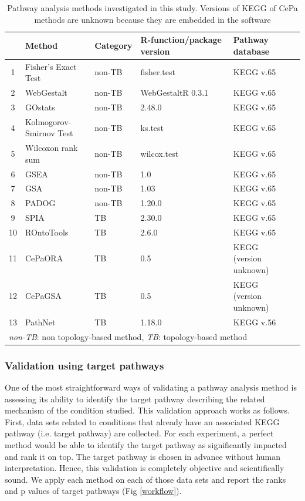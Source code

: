 \documentclass[Minh_PhD_thesis.tex]{subfiles}
\begin{document}
\begin{table}

\centering
\caption{Pathway analysis methods investigated in this study. Versions of KEGG of CePa methods are unknown because they are embedded in the software\label{table:PAmethods}} 
\small
\begin{tabular}{@{}clllll@{}}\hline
 & Method & Category  & R-function/package version & Pathway database \\\hline
1 & Fisher's Exact Test &	non-TB 	& fisher.test & KEGG v.65\\ 
2 & WebGestalt &	non-TB 	& WebGestaltR 0.3.1 & KEGG v.65\\ 
3 & GOstats &	non-TB 	&2.48.0 & KEGG v.65\\ 
4 & Kolmogorov-Smirnov Test& non-TB & ks.test & KEGG v.65\\
5 & Wilcoxon rank sum	& non-TB 	& wilcox.test &  KEGG v.65\\
6 & GSEA &	non-TB & 1.0 & KEGG v.65\\
7 & GSA &	non-TB & 1.03 & KEGG v.65\\
8 & PADOG &	non-TB & 1.20.0 & KEGG v.65\\
9 & SPIA &	TB  & 2.30.0 & KEGG v.65\\
10 & ROntoTools &		TB & 2.6.0 & KEGG v.65\\
11 & CePaORA &	TB & 0.5 & KEGG (version unknown)\\
12 & CePaGSA &	TB & 0.5 & KEGG (version unknown)\\
13 & PathNet &	TB & 1.18.0 & KEGG v.56\\
\hline
\multicolumn{5}{l}{\textit{non-TB}: non topology-based method, \textit{TB}: topology-based method}

\end{tabular}
\end{table}


\subsubsection{Validation using target pathways}

One of the most straightforward ways of validating a pathway analysis method is assessing its ability to identify the target pathway describing the related mechanism of the condition studied. 
This validation approach works as follows. First, data sets related to  conditions that already have an associated KEGG pathway (i.e. target pathway) are collected. For each experiment, a perfect method would be able to identify the target pathway as significantly impacted and rank it on top. The target pathway is chosen in advance without human interpretation. Hence, this validation is completely objective and scientifically sound. We apply each method on each of those data sets and report the ranks and p values of target pathways (Fig \ref{workflow}).
\end{document}
